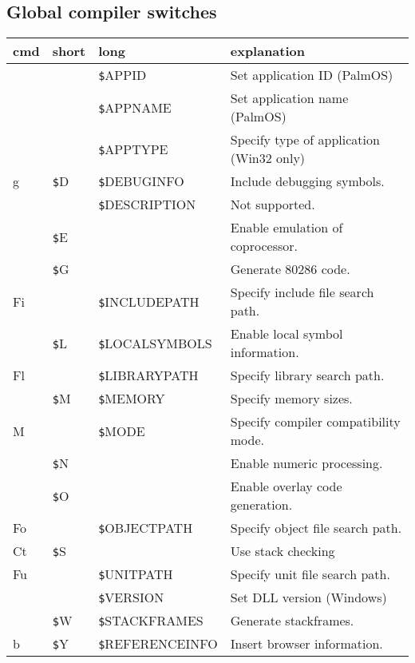 \documentclass{article}
\newcommand{\var}[1]{{\texttt #1}}
\begin{document}
\subsection*{Global compiler switches}
\begin{tabularx}{\textwidth}{lllX}
\textbf{cmd} & \textbf {short} & \textbf {long} & \textbf{explanation }\\ \hline
& & \var{\$APPID} & Set application ID (PalmOS) \\
& & \var{\$APPNAME} & Set application name (PalmOS) \\
& & \var{\$APPTYPE} & Specify type of application (Win32 only) \\
g& \var{\$D} & \var{\$DEBUGINFO} & Include debugging symbols. \\
& & \var{\$DESCRIPTION} & Not supported. \\
&\var{\$E} & & Enable emulation of coprocessor. \\
& \var{\$G}& & Generate 80286 code. \\
Fi& & \var{\$INCLUDEPATH} & Specify include file search path. \\
&\var{\$L} & \var{\$LOCALSYMBOLS} & Enable local symbol information. \\
Fl& & \var{\$LIBRARYPATH} & Specify library search path. \\
&\var{\$M} & \var{\$MEMORY} & Specify memory sizes. \\
M& & \var{\$MODE} & Specify compiler compatibility mode. \\
& \var{\$N}& & Enable numeric processing.  \\
& \var{\$O}& & Enable overlay code generation.  \\
Fo& & \var{\$OBJECTPATH} & Specify object file search path. \\
Ct& \var{\$S} & & Use stack checking \\
Fu& & \var{\$UNITPATH} & Specify unit file search path. \\
& & \var{\$VERSION} & Set DLL version (Windows)\\
& \var{\$W} & \var{\$STACKFRAMES} & Generate stackframes. \\
b & \var{\$Y} & \var{\$REFERENCEINFO} & Insert browser information. \\ \hline
\end{tabularx}
\end{document}
